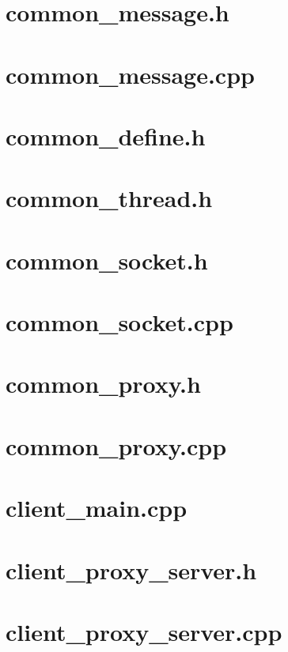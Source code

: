 \documentclass{article}
\begin{document}
\tableofcontents
\newpage
\section{ common\_message.h}

\newpage
\section{ common\_message.cpp}

\newpage
\section{ common\_define.h }

\newpage
\section{ common\_thread.h }

\newpage
\section{ common\_socket.h }

\newpage
\section{ common\_socket.cpp }

\newpage
\section{ common\_proxy.h }

\newpage
\section{ common\_proxy.cpp }

\newpage
\section{ client\_main.cpp }

\newpage
\section{ client\_proxy\_server.h }

\newpage
\section{ client\_proxy\_server.cpp }

\newpage
\end{document}
